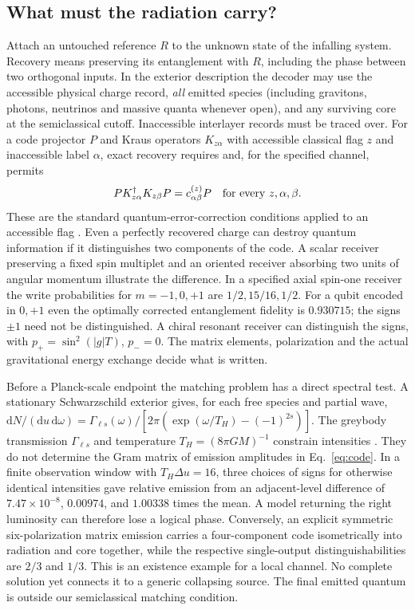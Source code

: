 \documentclass[11pt,a4paper]{article}
\newcommand{\dd}{\mathrm d}
\begin{document}
\subsection{What must the radiation carry?}
Attach an untouched reference \(R\) to the unknown state of the infalling system. Recovery means preserving its entanglement with \(R\), including the phase between two orthogonal inputs. In the exterior description the decoder may use the accessible physical charge record, \emph{all} emitted species (including gravitons, photons, neutrinos and massive quanta whenever open), and any surviving core at the semiclassical cutoff. Inaccessible interlayer records must be traced over. For a code projector \(P\) and Kraus operators \(K_{z\alpha}\) with accessible classical flag \(z\) and inaccessible label \(\alpha\), exact recovery requires and, for the specified channel, permits
\begin{equation}
 P K_{z\alpha}^\dagger K_{z\beta}P=c^{(z)}_{\alpha\beta}P
 \quad\hbox{for every }z,\alpha,\beta .
 \label{eq:code}
\end{equation}
These are the standard quantum-error-correction conditions applied to an accessible flag \cite{knill,gregoratti}. Even a perfectly recovered charge can destroy quantum information if it distinguishes two components of the code. A scalar receiver preserving a fixed spin multiplet and an oriented receiver absorbing two units of angular momentum illustrate the difference. In a specified axial spin-one receiver the write probabilities for \(m=-1,0,+1\) are \(1/2,15/16,1/2\). For a qubit encoded in \(0,+1\) even the optimally corrected entanglement fidelity is \(0.930715\); the signs \(\pm1\) need not be distinguished. A chiral resonant receiver can distinguish the signs, with \(p_+=\sin^2(|g|T)\), \(p_-=0\). The matrix elements, polarization and the actual gravitational energy exchange decide what is written.

Before a Planck-scale endpoint the matching problem has a direct spectral test. A stationary Schwarzschild exterior gives, for each free species and partial wave, \(\dd N/(\dd u\,\dd\omega)=\Gamma_{\ell s}(\omega)/[2\pi(\exp(\omega/T_H)-(-1)^{2s})]\). The greybody transmission \(\Gamma_{\ell s}\) and temperature \(T_H=(8\pi GM)^{-1}\) constrain intensities \cite{page}. They do not determine the Gram matrix of emission amplitudes in Eq.~\eqref{eq:code}. In a finite observation window with \(T_H\Delta u=16\), three choices of signs for otherwise identical intensities gave relative emission from an adjacent-level difference of \(7.47\times10^{-8}\), \(0.00974\), and \(1.00338\) times the mean. A model returning the right luminosity can therefore lose a logical phase. Conversely, an explicit symmetric six-polarization matrix emission carries a four-component code isometrically into radiation and core together, while the respective single-output distinguishabilities are \(2/3\) and \(1/3\). This is an existence example for a local channel. No complete solution yet connects it to a generic collapsing source. The final emitted quantum is outside our semiclassical matching condition.






\end{document}
